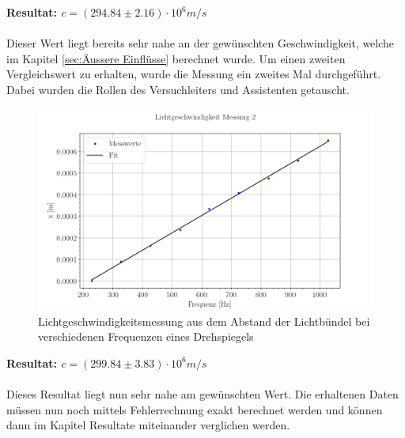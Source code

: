 \textbf{Resultat: $c = (294.84 \pm 2.16) \cdot 10^6 m/s$}\\
\\
Dieser Wert liegt bereits sehr nahe an der gewünschten Geschwindigkeit, welche im Kapitel \ref{sec:Äussere Einflüsse} berechnet wurde. Um einen zweiten Vergleichswert zu erhalten, wurde die Messung ein zweites Mal durchgeführt. Dabei wurden die Rollen des Versuchleiters und Assistenten getauscht.
\clearpage

\begin{figure}[ht]
\includegraphics[width=\textwidth]{graphics/messung_2.png}
\caption{Lichtgeschwindigkeitsmessung aus dem Abstand der Lichtbündel bei verschiedenen Frequenzen eines Drehspiegels} %
\label{fig:pol1}
\end{figure}
\textbf{Resultat: $c = (299.84 \pm 3.83) \cdot 10^6 m/s$}\\
\\
Dieses Resultat liegt nun sehr nahe am gewünschten Wert. Die erhaltenen Daten müssen nun noch mittels Fehlerrechnung exakt berechnet werden und können dann im Kapitel Resultate miteinander verglichen werden.
